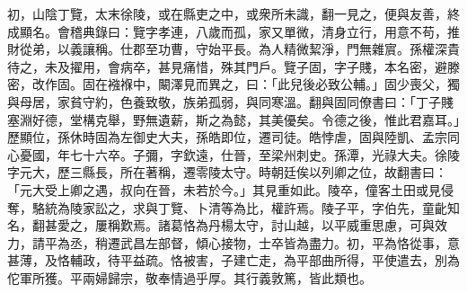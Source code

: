\begin{pinyinscope}
初，山陰丁覽，太末徐陵，或在縣吏之中，或衆所未識，翻一見之，便與友善，終成顯名。會稽典錄曰：覽字孝連，八歲而孤，家又單微，清身立行，用意不苟，推財從弟，以義讓稱。仕郡至功曹，守始平長。為人精微絜淨，門無雜賔。孫權深貴待之，未及擢用，會病卒，甚見痛惜，殊其門戶。覽子固，字子賤，本名密，避滕密，改作固。固在襁褓中，闞澤見而異之，曰：「此兒後必致公輔。」固少喪父，獨與母居，家貧守約，色養致敬，族弟孤弱，與同寒溫。翻與固同僚書曰：「丁子賤塞淵好德，堂構克舉，野無遺薪，斯之為懿，其美優矣。令德之後，惟此君嘉耳。」歷顯位，孫休時固為左御史大夫，孫皓即位，遷司徒。皓悖虐，固與陸凱、孟宗同心憂國，年七十六卒。子彌，字欽遠，仕晉，至梁州刺史。孫潭，光祿大夫。徐陵字元大，歷三縣長，所在著稱，遷零陵太守。時朝廷俟以列卿之位，故翻書曰：「元大受上卿之遇，叔向在晉，未若於今。」其見重如此。陵卒，僮客土田或見侵奪，駱統為陵家訟之，求與丁覽、卜清等為比，權許焉。陵子平，字伯先，童齔知名，翻甚愛之，屢稱歎焉。諸葛恪為丹楊太守，討山越，以平威重思慮，可與效力，請平為丞，稍遷武昌左部督，傾心接物，士卒皆為盡力。初，平為恪從事，意甚薄，及恪輔政，待平益疏。恪被害，子建亡走，為平部曲所得，平使遣去，別為佗軍所獲。平兩婦歸宗，敬奉情過乎厚。其行義敦篤，皆此類也。


\end{pinyinscope}
